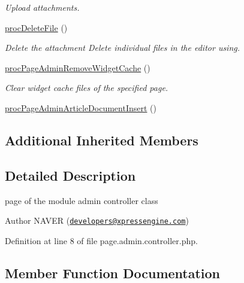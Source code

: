 \begin{DoxyCompactItemize}
\begin{DoxyCompactList}\small\item\em Upload attachments. \end{DoxyCompactList}\item 
\hyperlink{classpageAdminController_a79f90d79016b9550455e80c2ab6f72d8}{proc\+Delete\+File} ()
\begin{DoxyCompactList}\small\item\em Delete the attachment Delete individual files in the editor using. \end{DoxyCompactList}\item 
\hyperlink{classpageAdminController_a06b9c3a3052e15aa783e319c49ea8039}{proc\+Page\+Admin\+Remove\+Widget\+Cache} ()
\begin{DoxyCompactList}\small\item\em Clear widget cache files of the specified page. \end{DoxyCompactList}\item 
\hyperlink{classpageAdminController_a5ffba4fec0a2c2bd86b4c67fcaff61e8}{proc\+Page\+Admin\+Article\+Document\+Insert} ()
\end{DoxyCompactItemize}
\subsection*{Additional Inherited Members}


\subsection{Detailed Description}
page of the module admin controller class 

\begin{DoxyAuthor}{Author}
N\+A\+V\+ER (\href{mailto:developers@xpressengine.com}{\tt developers@xpressengine.\+com}) 
\end{DoxyAuthor}


Definition at line 8 of file page.\+admin.\+controller.\+php.



\subsection{Member Function Documentation}
\hypertarget{classpageAdminController_a404c9597cbe5970e977b4d756ec3a38a}{}\label{classpageAdminController_a404c9597cbe5970e977b4d756ec3a38a} 
